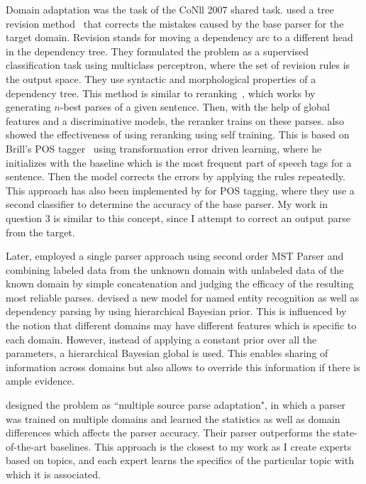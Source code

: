 Domain adaptation was the task of the CoNll 2007 shared task. 
\cite{attardi2007multilingual} used a tree revision method~\cite{attardi2007tree} that corrects the mistakes caused by the base parser for the target domain. Revision stands for moving a dependency arc to a different head in the dependency tree. They formulated the problem as a supervised classification task using multiclass perceptron, where the set of revision rules is the output space. They use syntactic and morphological properties of a dependency tree. This method is similar to reranking~\cite{charniak2005coarse,collins2005discriminative}, which works by generating $n$-best parses of a given sentence. Then, with the help of global features and a discriminative models, the reranker trains on these parses. \cite{McClosky:2006:ESP:1220835.1220855,McClosky:2006:RSP:1220175.1220218} also showed the effectiveness of using reranking using self training. This is based on Brill's POS tagger~\cite{brill1992simple,Brill:1995:TEL:218355.218367} using transformation error driven learning, where he initializes with the baseline which is the most frequent part of speech tags for a sentence. Then the model corrects the errors by applying the rules repeatedly. This approach has also been implemented by \cite{Nakagawa:2002:SBP:1118771.1118778,Nakagawa:2002:RLA:1073083.1073167} for POS tagging, where they use a second classifier to determine the accuracy of the base parser. My work in question 3 is similar to this concept, since I attempt to correct an output parse from the target.

Later, \cite{kawahara2008learning} employed a single parser approach using second order MST Parser and combining labeled data from the unknown domain with unlabeled data of the known domain by simple concatenation and judging the efficacy of the resulting most reliable parses. %
\cite{Finkel:2009:HBD:1620754.1620842} devised a new model for named entity recognition as well as dependency parsing by using hierarchical Bayesian prior. This is influenced by the notion that different domains may have different features which is specific to each domain.  However, instead of applying a constant prior over all the parameters,  a hierarchical Bayesian global is used. This enables sharing of information across domains but also allows to override this information if there is ample evidence. 

\cite{mcclosky2010automatic} designed the problem as ``multiple source parse adaptation", in which a parser was trained on multiple domains and learned the statistics as well as domain differences which affects the parser accuracy. Their parser outperforms the state-of-the-art baselines. This approach is the closest to my work as I create experts based on topics, and each expert learns the specifics of the particular topic with which it is associated. %

